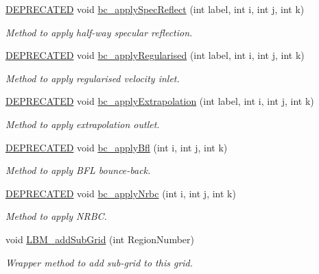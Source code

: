 \begin{DoxyCompactItemize}
\hyperlink{stdafx_8h_ac1e8a42306d8e67cb94ca31c3956ee78}{D\+E\+P\+R\+E\+C\+A\+T\+ED} void \hyperlink{class_grid_obj_ae1d63a43d1dee6c7b25880c8a9bb97c9}{bc\+\_\+apply\+Spec\+Reflect} (int label, int i, int j, int k)
\begin{DoxyCompactList}\small\item\em Method to apply half-\/way specular reflection. \end{DoxyCompactList}\item 
\hyperlink{stdafx_8h_ac1e8a42306d8e67cb94ca31c3956ee78}{D\+E\+P\+R\+E\+C\+A\+T\+ED} void \hyperlink{class_grid_obj_a5602705b2575b09e27dd0065de3542f6}{bc\+\_\+apply\+Regularised} (int label, int i, int j, int k)
\begin{DoxyCompactList}\small\item\em Method to apply regularised velocity inlet. \end{DoxyCompactList}\item 
\hyperlink{stdafx_8h_ac1e8a42306d8e67cb94ca31c3956ee78}{D\+E\+P\+R\+E\+C\+A\+T\+ED} void \hyperlink{class_grid_obj_a385c4803f4803e380a520ac9b3dcb31d}{bc\+\_\+apply\+Extrapolation} (int label, int i, int j, int k)
\begin{DoxyCompactList}\small\item\em Method to apply extrapolation outlet. \end{DoxyCompactList}\item 
\hyperlink{stdafx_8h_ac1e8a42306d8e67cb94ca31c3956ee78}{D\+E\+P\+R\+E\+C\+A\+T\+ED} void \hyperlink{class_grid_obj_aeff3b54617b7ae65f08c96e653f9035f}{bc\+\_\+apply\+Bfl} (int i, int j, int k)
\begin{DoxyCompactList}\small\item\em Method to apply B\+FL bounce-\/back. \end{DoxyCompactList}\item 
\hyperlink{stdafx_8h_ac1e8a42306d8e67cb94ca31c3956ee78}{D\+E\+P\+R\+E\+C\+A\+T\+ED} void \hyperlink{class_grid_obj_ae4fd999e7334c8ec8e1118c92e0c7338}{bc\+\_\+apply\+Nrbc} (int i, int j, int k)
\begin{DoxyCompactList}\small\item\em Method to apply N\+R\+BC. \end{DoxyCompactList}\item 
void \hyperlink{class_grid_obj_ab0d47be7ccafaa84b5d43da69e2082b9}{L\+B\+M\+\_\+add\+Sub\+Grid} (int Region\+Number)
\begin{DoxyCompactList}\small\item\em Wrapper method to add sub-\/grid to this grid. \end{DoxyCompactList}\item 

\end{DoxyCompactItemize}
